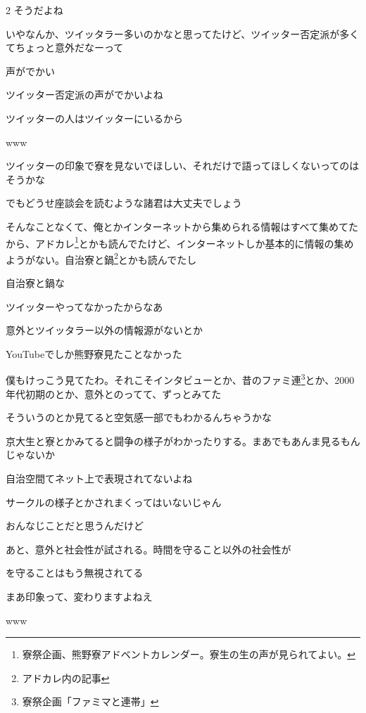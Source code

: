 \begin{multicols}{2}
 そうだよね

 いやなんか、ツイッタラー多いのかなと思ってたけど、ツイッター否定派が多くてちょっと意外だなーって

 声がでかい

 ツイッター否定派の声がでかいよね

 ツイッターの人はツイッターにいるから

 www

 ツイッターの印象で寮を見ないでほしい、それだけで語ってほしくないってのはそうかな

 でもどうせ座談会を読むような諸君は大丈夫でしょう

 そんなことなくて、俺とかインターネットから集められる情報はすべて集めてたから、アドカレ\footnote{寮祭企画、熊野寮アドベントカレンダー。寮生の生の声が見られてよい。}とかも読んでたけど、インターネットしか基本的に情報の集めようがない。自治寮と鍋\footnote{アドカレ内の記事}とかも読んでたし

 自治寮と鍋な

 ツイッターやってなかったからなあ

 意外とツイッタラー以外の情報源がないとか

 YouTubeでしか熊野寮見たことなかった

 僕もけっこう見てたわ。それこそインタビューとか、昔のファミ連\footnote{寮祭企画「ファミマと連帯」}とか、2000年代初期のとか、意外とのってて、ずっとみてた

 そういうのとか見てると空気感一部でもわかるんちゃうかな

 京大生と寮とかみてると闘争の様子がわかったりする。まあでもあんま見るもんじゃないか

 自治空間てネット上で表現されてないよね

 サークルの様子とかされまくってはいないじゃん

 おんなじことだと思うんだけど

 あと、意外と社会性が試される。時間を守ること以外の社会性が

 を守ることはもう無視されてる

 まあ印象って、変わりますよねえ

 www


\end{multicols}
